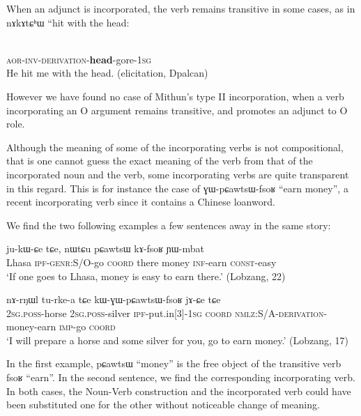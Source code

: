 \documentclass[oldfontcommands,oneside,a4paper,11pt]{article}
\newcommand{\ipa}[1]{{\phon #1}} %
\newcommand{\aor}{\textsc{aor}}
\newcommand{\coord}{\textsc{coord}}
\newcommand{\const}{\textsc{const}}
\newcommand{\imp}{\textsc{imp}}
\newcommand{\inftv}{\textsc{inf}}
\newcommand{\inv}{\textsc{inv}}
\newcommand{\ipf}{\textsc{ipf}}
\newcommand{\nmlz}{\textsc{nmlz}}
\newcommand{\poss}{\textsc{poss}}
\newcommand{\sg}{\textsc{sg}}
\begin{document}
When an adjunct is incorporated, the verb  remains transitive in some cases, as in \ipa{nɤkɤtɕʰɯ} ``hit with the head:
  \begin{exe}
\ex
\gll  \ipa{kɤ́-wɣ-nɤ-\textbf{kɤ}-tɕʰɯ-a}  	  \\
 \aor{}-\inv{}-\textsc{derivation}-\textbf{head}-gore-1\sg{} \\
 \glt He hit me with the head. (elicitation, Dpalcan)
\end{exe}   

However we have found no case of Mithun's type II incorporation, when a verb incorporating an O argument remains transitive, and promotes an adjunct to O role.

Although the meaning of some of the incorporating verbs is not compositional, that is one cannot guess the exact meaning of the verb from that of the incorporated noun and the verb, some incorporating verbs are quite transparent in this regard. This is for instance the case of \ipa{ɣɯ-pɕawtsɯ-fsoʁ} ``earn money'', a recent incorporating verb since it contains a Chinese loanword.

We find the two following examples a few sentences away in the same story:


 
 
 
 \begin{exe}
\ex
\gll    	\ipa{ɬasa} 	\ipa{ju-kɯ-ɕe} 		\ipa{tɕe,} 	\ipa{nɯtɕu}  \ipa{pɕawtsɯ} \ipa{kɤ-fsoʁ} 	\ipa{ɲɯ-mbat} \\
Lhasa	\textsc{ipf}-\textsc{genr}:S/O-go \coord{} there money \inftv{}-earn \const{}-easy \\
 \glt ‘If one goes to Lhasa, money is easy to earn there.’ (Lobzang, 22)
\end{exe}   
 
 \begin{exe}
\ex
\gll    	\ipa{nɤ-mbro} 	\ipa{nɤ-rŋɯl} 	\ipa{tu-rke-a} 		\ipa{tɕe} \ipa{kɯ-ɣɯ-pɕawtsɯ-fsoʁ} 			\ipa{jɤ-ɕe} 	\ipa{tɕe} \\
2\sg{}.\poss{}-horse	2\sg{}.\poss{}-silver	\ipf{}-put.in[3]-1\sg{}	\coord{} \nmlz{}:S/A-\textsc{derivation}-money-earn	\imp{}-go	\coord{} \\
 \glt ‘I will prepare a horse and some silver for you, go to earn money.’ (Lobzang, 17)
\end{exe}   
In the first example, \ipa{pɕawtsɯ} ``money'' is the free object of the transitive verb \ipa{fsoʁ} ``earn''. In the second sentence, we find the corresponding incorporating verb. In both cases, the Noun-Verb construction and the incorporated verb could have been substituted one for the other without noticeable change of meaning.
 
\end{document}
